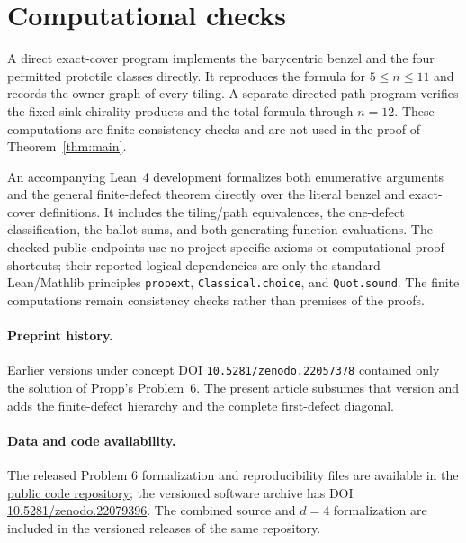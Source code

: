 \documentclass[11pt]{amsart}
\theoremstyle{definition}
\begin{document}


\section{Computational checks}

A direct exact-cover program implements the barycentric benzel and the
four permitted prototile classes directly.  It reproduces the formula for
$5\leq n\leq11$ and records the owner graph of every tiling.  A separate
directed-path program verifies the fixed-sink chirality products and the total
formula through $n=12$.  These computations are finite consistency checks and
are not used in the proof of Theorem~\ref{thm:main}.

An accompanying Lean~4 development formalizes both enumerative arguments and
the general finite-defect theorem directly over the literal benzel and
exact-cover definitions.  It includes the tiling/path equivalences, the
one-defect classification, the ballot sums, and both generating-function
evaluations.  The checked public endpoints use no project-specific axioms or
computational proof shortcuts; their reported logical dependencies are only
the standard Lean/Mathlib principles \texttt{propext},
\texttt{Classical.choice}, and \texttt{Quot.sound}.  The finite computations
remain consistency checks rather than premises of the proofs.

\paragraph{Preprint history.}
Earlier versions under concept DOI
\href{https://doi.org/10.5281/zenodo.22057378}
{\nolinkurl{10.5281/zenodo.22057378}} contained only the solution of
Propp's Problem~6.  The present article subsumes that version and adds the
finite-defect hierarchy and the complete first-defect diagonal.

\paragraph{Data and code availability.}
The released Problem 6 formalization and reproducibility files are available in the
\href{https://github.com/crabsatellite/peripheral-benzel-tilings}{public code
repository}; the versioned software archive has DOI
\href{https://doi.org/10.5281/zenodo.22079396}{10.5281/zenodo.22079396}.
The combined source and $d=4$ formalization are included in the versioned
releases of the same repository.
\end{document}

